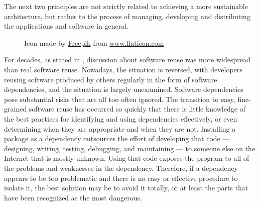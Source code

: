 The next two principles are not strictly related to achieving a more sustainable
architecture, but rather to the process of managing, developing and distributing
the applications and software in general. \\ %

\begin{figure} %
  \centering
  \def\stackalignment{r} %
  {\scriptsize \parbox[t]{\linewidth}{ Icon made by \href{https://www.flaticon.com/authors/freepik}{Freepik} from \href{http://www.flaticon.com}{www.flaticon.com} }}
\end{figure}

For decades, as stated in \cite{software_dependency_problem}, discussion about
software reuse was more widespread than real software reuse. Nowadays, the
situation is reversed, with developers reusing software produced by others regularly
in the form of software dependencies, and the situation is largely unexamined. Software
dependencies pose substantial risks that are all too often ignored. The
transition to easy, fine-grained software reuse has occurred so quickly that there
is little knowledge of the best practices for identifying and using dependencies
effectively, or even determining when they are appropriate and when they are not.
Installing a package as a dependency outsources the effort of developing that code
--- designing, writing, testing, debugging, and maintaining --- to someone else on
the Internet that is mostly unknown. Using that code exposes the program to all
of the problems and weaknesses in the dependency. Therefore, if a dependency
appears to be too problematic and there is no easy or effective procedure to
isolate it, the best solution may be to avoid it totally, or at least the parts
that have been recognized as the most dangerous. \\ %

